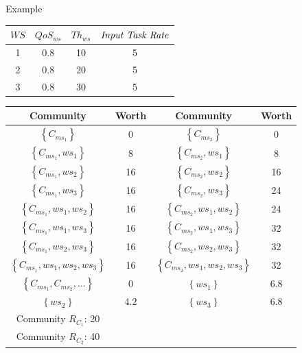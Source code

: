 \documentclass{beamer}
\begin{document}
\begin{frame}{Example}
    \begin{table}[!t]
    \renewcommand{\arraystretch}{0.8}
    \label{example_3}
    \centering
    \begin{tabular}{c c c c}
    \hline
    $WS$ & $QoS_{ws}$ & $Th_{ws}$ & $\text{\emph{Input Task Rate}}$\\
    \hline
    1 & 0.8 & 10 & 5\\
    2 & 0.8 & 20 & 5\\
    3 & 0.8 & 30 & 5\\
    \hline
    \end{tabular}
    \end{table}

    \begin{table}[!t]
    \renewcommand{\arraystretch}{0.8}
    \label{example_3_2}
    \centering
    \begin{tabular}{c c || c c}
    \hline
    Community & Worth & Community & Worth\\
    \hline
    $\left\{C_{ms_1}\right\}$ & 0 & $\left\{C_{ms_2}\right\}$ & 0\\
    $\left\{C_{ms_1}, ws_1\right\}$ & 8 & $\left\{C_{ms_2}, ws_1\right\}$ & 8\\
    $\left\{C_{ms_1}, ws_2\right\}$ & 16 & $\left\{C_{ms_2}, ws_2\right\}$ & 16\\
    $\left\{C_{ms_1}, ws_3\right\}$ & 16 & $\left\{C_{ms_2}, ws_3\right\}$ & 24\\
    $\left\{C_{ms_1}, ws_1, ws_2\right\}$ & 16 & $\left\{C_{ms_2}, ws_1, ws_2\right\}$ & 24\\
    $\left\{C_{ms_1}, ws_1, ws_3\right\}$ & 16 & $\left\{C_{ms_2}, ws_1, ws_3\right\}$ & 32\\
    $\left\{C_{ms_1}, ws_2, ws_3\right\}$ & 16 & $\left\{C_{ms_2}, ws_2, ws_3\right\}$ & 32\\
    $\left\{C_{ms_1}, ws_1, ws_2, ws_3\right\}$ & 16 & $\left\{C_{ms_2}, ws_1, ws_2, ws_3\right\}$ & 32\\
    $\left\{C_{ms_1}, C_{ms_2}, ...\right\}$ & 0 & $\left\{ws_1\right\}$ & 6.8\\
    $\left\{ws_2\right\}$ & 4.2 & $\left\{ws_3\right\}$ & 6.8\\
    \hline
    Community $R_{C_1}$: 20 \\ Community $R_{C_2}$: 40\\
    \hline
    \end{tabular}
    \end{table}
\end{frame}
\end{document}
